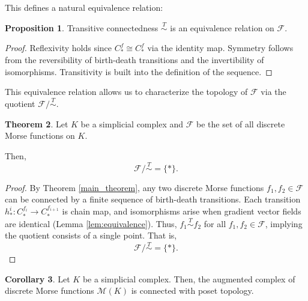 \documentclass[a4paper,12pt,notitlepage]{amsart}
\theoremstyle{definition}%
\newtheorem{theorem}{Theorem}[section]
\newtheorem{proposition}[theorem]{Proposition}
\newtheorem{corollary}[theorem]{Corollary}
\theoremstyle{definition}%
\theoremstyle{definition}%
\newcommand{\M}{\mathcal{M}}
\newcommand{\Tsim}{\stackrel T\sim }
\begin{document}
This defines a natural equivalence relation:
\begin{proposition}
Transitive connectedness $\Tsim$ is an equivalence relation on $\mathcal{F}$.
\end{proposition}

\begin{proof}
Reflexivity holds since $C_{\ast}^{f} \cong C_{\ast}^{f}$ via the identity map.
 Symmetry follows from the reversibility of birth-death transitions and the invertibility of isomorphisms.
Transitivity is built into the definition of the sequence.

\end{proof}


This equivalence relation allows us to
 characterize the topology of 
$\mathcal{F}$ via the quotient
$\mathcal{F}/ \Tsim$.

\begin{theorem}

Let $K$ be a simplicial complex
and $\mathcal{F}$ be the set of all discrete Morse functions on $K$.

Then,
$$\mathcal{F}/ \Tsim= \{\ast \}.$$

\end{theorem}

\begin{proof}
By Theorem \ref{main_theorem}, any two discrete Morse functions
$f_1,f_2\in \mathcal{F}$
can be connected by a finite sequence of birth-death transitions.
Each transition
$h_{\ast}^{i}:C_{\ast}^{f_i} \to C_{\ast}^{f_{i+1}}$
is chain map,
and isomorphisms arise when gradient vector fields are identical (Lemma \ref{lem:equivalence}).
Thus, 
$f_1\Tsim f_2$
for all 
$f_1,f_2\in \mathcal{F}$,
implying the quotient consists of a single point.
That is,
$$\mathcal{F}/ \Tsim= \{\ast \}.$$

\end{proof}


\begin{corollary}
Let $K$ be a simplicial complex.
Then,
the augmented complex of discrete Morse functions $\M(K)$ 
is connected with poset topology.

\end{corollary}



\end{document}
